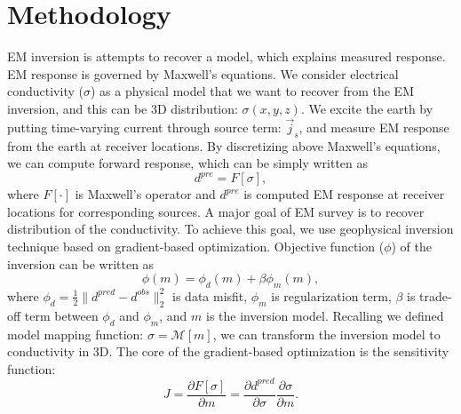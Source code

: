 \documentclass{segabs}
\newcommand{\curl}{{\vec \nabla}\times}
\newcommand {\J}{{\vec J}}
\newcommand {\E}{{\vec E}}
\newcommand{\B}{\vec{B}}
\renewcommand {\j}  { {\vec j} }
\renewcommand {\b}  { {\vec b} }
\newcommand {\e}  { {\vec e} }
\newcommand{\dbdt}{\frac{\partial \b}{\partial t}}
\begin{document}
\section*{Methodology}
EM inversion is attempts to recover a model, which explains measured response. EM response is governed by Maxwell's equations. 
We consider electrical conductivity ($\sigma$) as a physical model that we want to recover from the EM inversion, and this can be 3D distribution: $\sigma(x, y, z)$. We excite the earth by putting time-varying current through source term: $\j_s$, and measure EM response from the earth at receiver locations. By discretizing above Maxwell's equations, we can compute forward response, which can be simply written as
\begin{equation}
  d^{pre} = F[\sigma],
\end{equation}
where $F[\cdot]$ is Maxwell's operator and $d^{pre}$ is computed EM response at receiver locations for corresponding sources.
A major goal of EM survey is to recover distribution of the conductivity. To achieve this goal, we use geophysical inversion technique based on gradient-based optimization. Objective function ($\phi$) of the inversion can be written as
\begin{equation}
  \phi(m) = \phi_d(m) + \beta\phi_m(m),
\end{equation}
where $\phi_d=\frac{1}{2}\|d^{pred}-d^{obs}\|^2_2$ is data misfit, $\phi_m$ is regularization term, $\beta$ is trade-off term between $\phi_d$ and $\phi_m$, and $m$ is the inversion model. Recalling we defined model mapping function: $\sigma = \mathcal{M}[m]$, we can transform the inversion model to conductivity in 3D. The core of the gradient-based optimization is the sensitivity function:
\begin{equation}
  J = \frac{\partial F[\sigma]}{\partial m} = \frac{\partial d^{pred}}{\partial \sigma}\frac{\partial \sigma}{\partial m}.
\end{equation}
\end{document}

